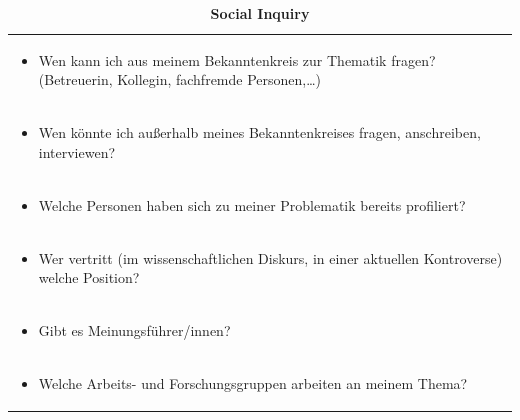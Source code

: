 \documentclass[]{book}
\providecommand{\tightlist}{%
  \setlength{\itemsep}{0pt}\setlength{\parskip}{0pt}}
\theoremstyle{definition}
\theoremstyle{definition}
\theoremstyle{definition}
\theoremstyle{remark}
\begin{document}
\begin{longtable}[]{@{}l@{}}
\caption{\textbf{\label{tab:enquiry} Social Inquiry}}\tabularnewline
\toprule
\begin{minipage}[t]{0.97\columnwidth}\raggedright\strut
\begin{itemize}
\tightlist
\item
  Wen kann ich aus meinem Bekanntenkreis zur Thematik fragen?
  (Betreuerin, Kollegin, fachfremde Personen,\ldots{})
\end{itemize}\strut
\end{minipage}\tabularnewline
\begin{minipage}[t]{0.97\columnwidth}\raggedright\strut
\begin{itemize}
\tightlist
\item
  Wen könnte ich außerhalb meines Bekanntenkreises fragen, anschreiben,
  interviewen?
\end{itemize}\strut
\end{minipage}\tabularnewline
\begin{minipage}[t]{0.97\columnwidth}\raggedright\strut
\begin{itemize}
\tightlist
\item
  Welche Personen haben sich zu meiner Problematik bereits profiliert?
\end{itemize}\strut
\end{minipage}\tabularnewline
\begin{minipage}[t]{0.97\columnwidth}\raggedright\strut
\begin{itemize}
\tightlist
\item
  Wer vertritt (im wissenschaftlichen Diskurs, in einer aktuellen
  Kontroverse) welche Position?
\end{itemize}\strut
\end{minipage}\tabularnewline
\begin{minipage}[t]{0.97\columnwidth}\raggedright\strut
\begin{itemize}
\tightlist
\item
  Gibt es Meinungsführer/innen?
\end{itemize}\strut
\end{minipage}\tabularnewline
\begin{minipage}[t]{0.97\columnwidth}\raggedright\strut
\begin{itemize}
\tightlist
\item
  Welche Arbeits- und Forschungsgruppen arbeiten an meinem Thema?
\end{itemize}\strut
\end{minipage}\tabularnewline

\end{longtable}
\end{document}
